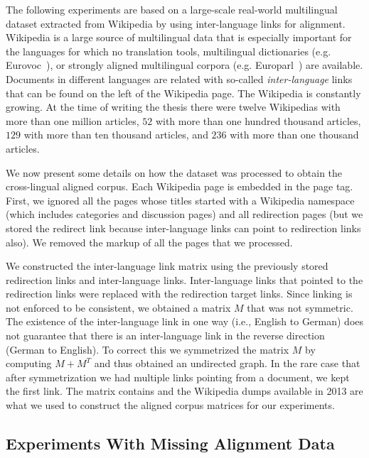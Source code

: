 The following experiments are based on a large-scale real-world multilingual dataset
extracted from Wikipedia by using inter-language links for alignment.
Wikipedia is a large source of multilingual data that is especially important for the languages for which no
translation tools, multilingual dictionaries (e.g. Eurovoc~\cite{eurovoc}), or strongly
aligned multilingual corpora (e.g. Europarl~\cite{europarl}) are available. Documents
in different languages are related with so-called \emph{inter-language} links that
can be found on the left of the Wikipedia page. The Wikipedia is constantly growing.
At the time of writing the thesis there were twelve Wikipedias with more than one million articles, $52$ with more
than one hundred thousand articles, $129$ with more than ten thousand articles, and $236$
with more than one thousand articles.

We now present some details on how the dataset was processed to obtain the cross-lingual aligned corpus.
Each Wikipedia page is embedded in the page tag. First, we ignored all the pages whose titles started with a Wikipedia namespace
(which includes categories and discussion pages) and all redirection pages (but we stored the redirect link because inter-language
links can point to redirection links also). We removed the markup of all the pages that we processed.

We constructed the inter-language link matrix using the previously stored redirection links and inter-language links.
Inter-language links that pointed to the redirection links were replaced with the redirection target links. Since linking
is not enforced to be consistent, we obtained a matrix $M$ that was not symmetric. The existence of the inter-language link in
one way (i.e., English to German) does not guarantee that there is an inter-language link in the reverse direction (German to English).
To correct this we symmetrized the matrix $M$ by computing $M+M^T$ and thus obtained an undirected graph. In the rare case that
after symmetrization we had multiple links pointing from a document, we kept the first link. The matrix contains and
the Wikipedia dumps available in 2013 are what we used to construct the aligned corpus matrices for our experiments.

\subsection{Experiments With Missing Alignment Data}\label{experiments:hubcca}

